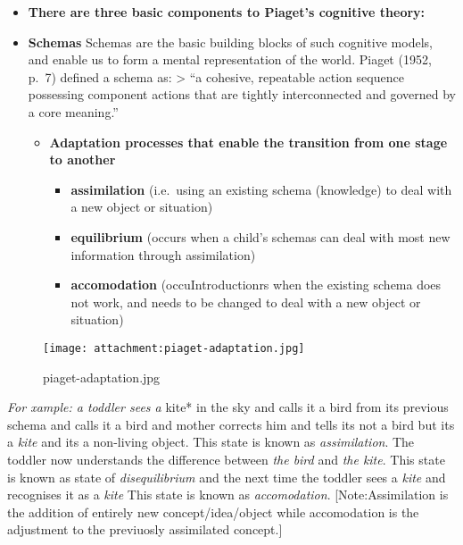 \documentclass[11pt]{article}
\makeatletter
\def\maxwidth{\ifdim\Gin@nat@width>\linewidth\linewidth
    \else\Gin@nat@width\fi}
\let\Oldincludegraphics\includegraphics
\renewcommand{\includegraphics}[1]{\Oldincludegraphics[width=.8\maxwidth]{#1}}
\providecommand{\tightlist}{%
      \setlength{\itemsep}{0pt}\setlength{\parskip}{0pt}}
\makeatother
\begin{document}
\begin{itemize}
\item
  \textbf{There are three basic components to Piaget's cognitive
  theory:}
\item
  \textbf{Schemas} Schemas are the basic building blocks of such
  cognitive models, and enable us to form a mental representation of the
  world. Piaget (1952, p.~7) defined a schema as: \textgreater{} ``a
  cohesive, repeatable action sequence possessing component actions that
  are tightly interconnected and governed by a core meaning.''

  \begin{itemize}
  \tightlist
  \item
    \textbf{Adaptation processes that enable the transition from one
    stage to another}

    \begin{itemize}
    \tightlist
    \item
      \textbf{assimilation} (i.e.~using an existing schema (knowledge)
      to deal with a new object or situation)
    \item
      \textbf{equilibrium} (occurs when a child's schemas can deal with
      most new information through assimilation)
    \item
      \textbf{accomodation} (occuIntroductionrs when the existing schema
      does not work, and needs to be changed to deal with a new object
      or situation)
    \end{itemize}
  \end{itemize}
\end{itemize}

\begin{figure}
\centering
\texttt{[image: attachment:piaget-adaptation.jpg]}
\caption{piaget-adaptation.jpg}
\end{figure}

\emph{For xample: a toddler sees a }kite* in the sky and calls it a bird
from its previous schema and calls it a bird and mother corrects him and
tells its not a bird but its a \emph{kite} and its a non-living object.
This state is known as \emph{assimilation}. The toddler now understands
the difference between \emph{the bird} and \emph{the kite}. This state
is known as state of \emph{disequilibrium} and the next time the toddler
sees a \emph{kite} and recognises it as a \emph{kite} This state is
known as \emph{accomodation}. {[}Note:Assimilation is the addition of
entirely new concept/idea/object while accomodation is the adjustment to
the previuosly assimilated concept.{]}
\end{document}
